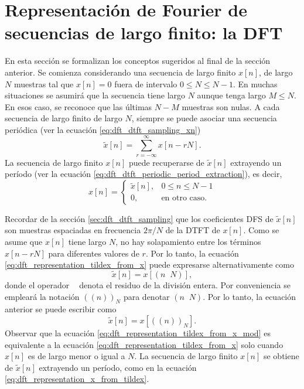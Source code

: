 \documentclass[a4paper]{report}
\DeclareMathOperator{\modulo}{m\acute odulo}
\begin{document}
\section{Representación de Fourier de secuencias de largo finito: la DFT}

En esta sección se formalizan los conceptos sugeridos al final de la sección anterior. Se comienza considerando una secuencia de largo finito \(x[n]\), de largo \(N\) muestras tal que \(x[n]=0\) fuera de intervalo \(0\leq N\leq N-1\). En muchas situaciones se asumirá que la secuencia tiene largo \(N\) aunque tenga largo \(M\leq N\). En esos caso, se reconoce que las últimas \(N-M\) muestras son nulas. A cada secuencia de largo finito de largo \(N\), siempre se puede asociar una secuencia periódica (ver la ecuación \ref{eq:dft_dtft_sampling_xn})
\begin{equation}\label{eq:dft_representation_tildex_from_x}
 \tilde{x}[n]=\sum_{r=-\infty}^\infty x[n-rN]. 
\end{equation}
La secuencia de largo finito \(x[n]\) puede recuperarse de \(\tilde{x}[n]\) extrayendo un período (ver la ecuación \ref{eq:dft_dtft_periodic_period_extraction}), es decir, 
\begin{equation}\label{eq:dft_representation_x_from_tildex}
 x[n]=
 \left\{
 \begin{array}{ll}
  \tilde{x}[n], & 0\leq n\leq N-1\\
  0, & \textrm{en otro caso.}
 \end{array}
 \right.  
\end{equation}

Recordar de la sección \ref{sec:dft_dtft_sampling} que los coeficientes DFS de \(\tilde{x}[n]\) son muestras espaciadas en frecuencia \(2\pi/N\) de la DTFT de \(x[n]\). Como se asume que \(x[n]\) tiene largo \(N\), no hay solapamiento entre los términos \(x[n-rN]\) para diferentes valores de \(r\). Por lo tanto, la ecuación \ref{eq:dft_representation_tildex_from_x} puede expresarse alternativamente como
\[
 \tilde{x}[n]=x[(n\modulo N)],
\]
donde el operador \(\modulo\) denota el residuo de la división entera. Por conveniencia se empleará la notación \(((n))_N\) para denotar \((n\modulo N)\). Por lo tanto, la ecuación anterior se puede escribir como
\begin{equation}\label{eq:dft_representation_tildex_from_x_mod}
 \tilde{x}[n]=x[((n))_N]. 
\end{equation}
Observar que la ecuación \ref{eq:dft_representation_tildex_from_x_mod} es equivalente a la ecuación \ref{eq:dft_representation_tildex_from_x} solo cuando \(x[n]\) es de largo menor o igual a \(N\). La secuencia de largo finito \(x[n]\) se obtiene de \(\tilde{x}[n]\) extrayendo un período, como en la ecuación \ref{eq:dft_representation_x_from_tildex}.
\end{document}
